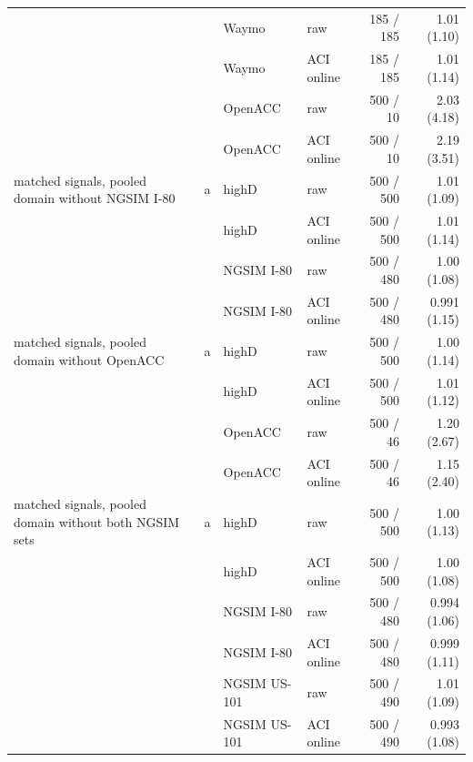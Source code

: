 \begin{longtable}{llllrr}
 &  & Waymo & raw & 185 / 185 & 1.01 (1.10) \\
 &  & Waymo & ACI online & 185 / 185 & 1.01 (1.14) \\
 &  & OpenACC & raw & 500 / 10 & 2.03 (4.18) \\
 &  & OpenACC & ACI online & 500 / 10 & 2.19 (3.51) \\
\midrule
matched signals, pooled domain without NGSIM I-80 & a & highD & raw & 500 / 500 & 1.01 (1.09) \\
 &  & highD & ACI online & 500 / 500 & 1.01 (1.14) \\
 &  & NGSIM I-80 & raw & 500 / 480 & 1.00 (1.08) \\
 &  & NGSIM I-80 & ACI online & 500 / 480 & 0.991 (1.15) \\
\midrule
matched signals, pooled domain without OpenACC & a & highD & raw & 500 / 500 & 1.00 (1.14) \\
 &  & highD & ACI online & 500 / 500 & 1.01 (1.12) \\
 &  & OpenACC & raw & 500 / 46 & 1.20 (2.67) \\
 &  & OpenACC & ACI online & 500 / 46 & 1.15 (2.40) \\
\midrule
matched signals, pooled domain without both NGSIM sets & a & highD & raw & 500 / 500 & 1.00 (1.13) \\
 &  & highD & ACI online & 500 / 500 & 1.00 (1.08) \\
 &  & NGSIM I-80 & raw & 500 / 480 & 0.994 (1.06) \\
 &  & NGSIM I-80 & ACI online & 500 / 480 & 0.999 (1.11) \\
 &  & NGSIM US-101 & raw & 500 / 490 & 1.01 (1.09) \\
 &  & NGSIM US-101 & ACI online & 500 / 490 & 0.993 (1.08) \\
\end{longtable}
\endgroup
